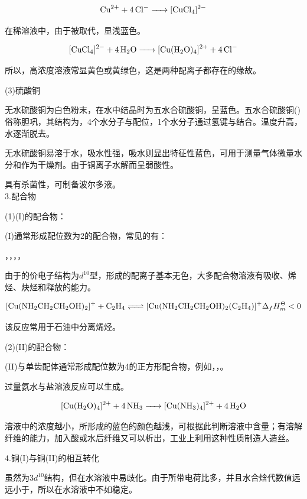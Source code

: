 \documentclass[a4paper,UTF8]{article}
\begin{document}
$$ \ce{Cu^{2+} + 4Cl- -> [CuCl4]^{2-}} $$

在稀溶液中，由于被取代，显浅蓝色。

$$ \ce{[CuCl4]^{2-} + 4H2O -> [Cu(H2O)4]^{2+} + 4Cl-} $$

所以，高浓度溶液常显黄色或黄绿色，这是两种配离子都存在的缘故。

(3)硫酸铜

无水硫酸铜为白色粉末，在水中结晶时为五水合硫酸铜，呈蓝色。五水合硫酸铜()俗称胆巩，其结构为，4个水分子与配位，1个水分子通过氢键与结合。温度升高，水逐渐脱去。

无水硫酸铜易溶于水，吸水性强，吸水则显出特征性蓝色，可用于测量气体微量水分和作为干燥剂。由于铜离子水解而呈弱酸性。

具有杀菌性，可制备波尔多液。\\

3.配合物

(1)(I)的配合物：

(I)通常形成配位数为2的配合物，常见的有：

\ce{[Cu(SCN)2]+}，\ce{[CuCl2]-}，\ce{[Cu(NH3)2]+}，，\ce{[Cu(CN)2]-}

由于的价电子结构为$d^{10}$型，形成的配离子基本无色，大多配合物溶液有吸收、烯烃、炔烃和释放的能力。

$$ \ce{[Cu(NH2CH2CH2OH)2]+ + C2H4 <=> [Cu(NH2CH2CH2OH)2(C2H4)]+} \Delta _{f}H^{\Theta}_{m}<0$$

该反应常用于石油中分离烯烃。

(2)(II)的配合物：

(II)与单齿配体通常形成配位数为4的正方形配合物，例如，，。

过量氨水与盐溶液反应可以生成。

$$ \ce{[Cu(H2O)4]^{2+} + 4NH3 -> [Cu(NH3)4]^{2+} + 4H2O} $$

溶液中的浓度越小，所形成的蓝色的颜色越浅，可根据此判断溶液中含量；有溶解纤维的能力，加入酸或水后纤维又可以析出，工业上利用这种性质制造人造丝。

4.铜(I)与铜(II)的相互转化

虽然为$3d^{10}$结构，但在水溶液中易歧化。由于所带电荷比多，并且水合焓代数值远远小于，所以在水溶液中不如稳定。
\end{document}
